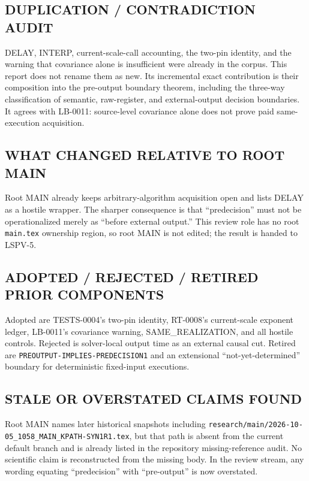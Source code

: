 \documentclass[11pt]{article}
\begin{document}
\subsection*{DUPLICATION / CONTRADICTION AUDIT}
DELAY, INTERP, current-scale-call accounting, the two-pin identity, and the
warning that covariance alone is insufficient were already in the corpus.
This report does not rename them as new.  Its incremental exact contribution
is their composition into the pre-output boundary theorem, including the
three-way classification of semantic, raw-register, and external-output
decision boundaries.  It agrees with LB-0011: source-level covariance alone
does not prove paid same-execution acquisition.

\subsection*{WHAT CHANGED RELATIVE TO ROOT MAIN}
Root MAIN already keeps arbitrary-algorithm acquisition open and lists DELAY
as a hostile wrapper.  The sharper consequence is that ``predecision'' must
not be operationalized merely as ``before external output.''  This review
role has no root \texttt{main.tex} ownership region, so root MAIN is not
edited; the result is handed to LSPV-5.

\subsection*{ADOPTED / REJECTED / RETIRED PRIOR COMPONENTS}
Adopted are TESTS-0004's two-pin identity, RT-0008's current-scale exponent
ledger, LB-0011's covariance warning, SAME\_REALIZATION, and all hostile
controls.  Rejected is solver-local output time as an external causal cut.
Retired are \texttt{PREOUTPUT-IMPLIES-PREDECISION1} and an extensional
``not-yet-determined'' boundary for deterministic fixed-input executions.

\subsection*{STALE OR OVERSTATED CLAIMS FOUND}
Root MAIN names later historical snapshots including
\texttt{research/main/2026-10-05\_1058\_MAIN\_KPATH-SYN1R1.tex}, but that path
is absent from the current default branch and is already listed in the
repository missing-reference audit.  No scientific claim is reconstructed
from the missing body.  In the review stream, any wording equating
``predecision'' with ``pre-output'' is now overstated.
\end{document}
